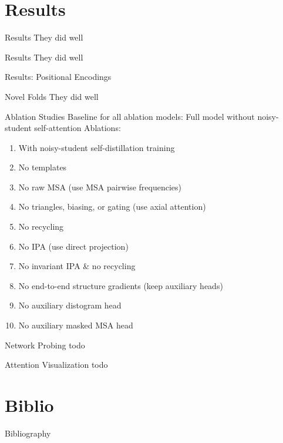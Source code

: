 \documentclass[presentation, smaller]{beamer}
\begin{document}
\section*{Results}
\label{sec:org4ef331a}
\begin{frame}[label={sec:org6b3b90c}]{Results \cite{jumperHighlyAccurateProtein2021}}
They did well
\end{frame}

\begin{frame}[label={sec:orgc309509}]{Results \cite{jumperHighlyAccurateProtein2021}}
They did well
\end{frame}

\begin{frame}[label={sec:org70b5463}]{Results: Positional Encodings \cite{jumperHighlyAccurateProtein2021}}
\end{frame}

\begin{frame}[label={sec:orgffe6e9e}]{Novel Folds}
They did well
\end{frame}

\begin{frame}[label={sec:org8f87b1b}]{Ablation Studies \cite{jumperHighlyAccurateProtein2021}}
Baseline for all ablation models: Full model without noisy-student self-attention  
Ablations:
\begin{enumerate}
\item With noisy-student self-distillation training
\item No templates
\item No raw MSA (use MSA pairwise frequencies)
\item No triangles, biasing, or gating (use axial attention)
\item No recycling
\item No IPA (use direct projection)
\item No invariant IPA \& no recycling
\item No end-to-end structure gradients (keep auxiliary heads)
\item No auxiliary distogram head
\item No auxiliary masked MSA head
\end{enumerate}
\end{frame}

\begin{frame}[label={sec:orgcb859bb}]{Network Probing \cite{jumperHighlyAccurateProtein2021}}
todo
\end{frame}

\begin{frame}[label={sec:org0b4e4a8}]{Attention Visualization \cite{jumperHighlyAccurateProtein2021}}
todo
\end{frame}

\section*{Biblio}
\label{sec:org0184652}
\begin{frame}[fragile,allowframebreaks,label=]{Bibliography}
\printbibliography
\end{frame}
\end{document}
